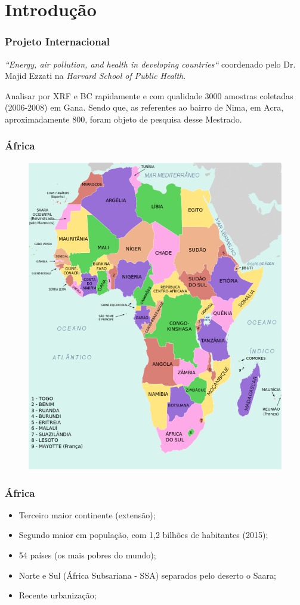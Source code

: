 \section{Introdução}

\begin{frame}
  \frametitle{Projeto Internacional}
   \begin{tcolorbox}[colback=blue!5,colframe=blue!40!black,title=Projeto Internacional]
    \textit{``Energy, air pollution, and health in developing countries``}
             coordenado pelo Dr. Majid Ezzati na \textit{Harvard School of Public Health}.
   \end{tcolorbox}
   
   \begin{tcolorbox}[colback=blue!5,colframe=blue!40!black,title=Mestrado em Nima]
      Analisar por XRF e BC rapidamente e com qualidade 3000 amostras coletadas (2006-2008) em Gana. 
      Sendo que, as referentes ao bairro de Nima, em Acra, aproximadamente 800, foram objeto de pesquisa desse Mestrado.
   \end{tcolorbox}
  
\end{frame}

\begin{frame}
  \frametitle{África}
  \begin{figure}[H]
  \centering
  \includegraphics[width=0.55\linewidth]{../../inputs/images/africa_wikipedia.pdf}
  \end{figure}
\end{frame}

\begin{frame}
  \frametitle{África}
   \begin{itemize}
     \item Terceiro maior continente (extensão);
     \item Segundo maior em população, com 1,2 bilhões de habitantes (2015);
     \item 54 países (os mais pobres do mundo);
     \item Norte e Sul (África Subsariana - SSA) separados pelo deserto o Saara;
     \item Recente urbanização;
   \end{itemize}
\end{frame}

